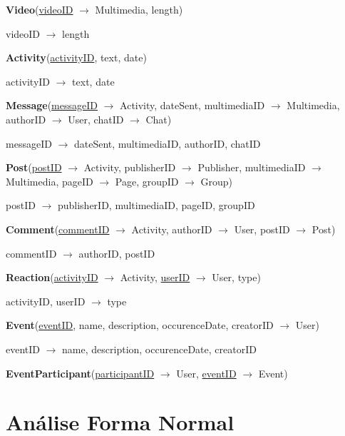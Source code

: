 \documentclass[12pt]{report}
\begin{document}
\textbf{Video}(\underline{videoID} $\rightarrow$ Multimedia, length)

videoID $\rightarrow$ length

\vspace{2mm}

\textbf{Activity}(\underline{activityID}, text, date)

activityID $\rightarrow$ text, date

\vspace{2mm}

\textbf{Message}(\underline{messageID} $\rightarrow$ Activity, dateSent, multimediaID $\rightarrow$ Multimedia, authorID $\rightarrow$ User, chatID $\rightarrow$ Chat)

messageID $\rightarrow$ dateSent, multimediaID, authorID, chatID

\vspace{2mm}

\textbf{Post}(\underline{postID} $\rightarrow$ Activity, publisherID $\rightarrow$ Publisher, multimediaID $\rightarrow$ Multimedia, pageID $\rightarrow$ Page, groupID $\rightarrow$ Group)

postID $\rightarrow$ publisherID, multimediaID, pageID, groupID

\vspace{2mm}

\textbf{Comment}(\underline{commentID} $\rightarrow$ Activity, authorID $\rightarrow$ User, postID $\rightarrow$ Post)

commentID $\rightarrow$ authorID, postID

\vspace{2mm}

\textbf{Reaction}(\underline{activityID} $\rightarrow$ Activity, \underline{userID} $\rightarrow$ User, type)

activityID, userID $\rightarrow$ type

\vspace{2mm}

\textbf{Event}(\underline{eventID}, name, description, occurenceDate, creatorID $\rightarrow$ User)

eventID $\rightarrow$ name, description, occurenceDate, creatorID

\vspace{2mm}

\textbf{EventParticipant}(\underline{participantID} $\rightarrow$ User, \underline{eventID} $\rightarrow$ Event)

\pagebreak

\section{Análise Forma Normal}
\end{document}
